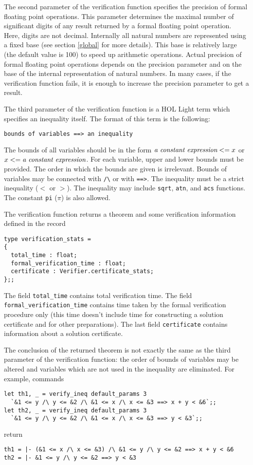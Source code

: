 \documentclass[a4paper]{article}
\begin{document}
The second parameter of the verification function specifies the precision of formal floating point operations. This parameter determines the maximal number of significant digits of any result returned by a formal floating point operation. Here, digits are not decimal. Internally all natural numbers are represented using a fixed base (see section \ref{global} for more details). This base is relatively large (the default value is 100) to speed up arithmetic operations. Actual precision of formal floating point operations depends on the precision parameter and on the base of the internal representation of natural numbers. In many cases, if the verification function fails, it is enough to increase the precision parameter to get a result.

The third parameter of the verification function is a HOL Light term which specifies an inequality itself. The format of this term is the following:
\begin{verbatim}
bounds of variables ==> an inequality
\end{verbatim}
The bounds of all variables should be in the form $\text{\it a constant expression} <= x$ or $x <= \text{\it a constant expression}$. For each variable, upper and lower bounds must be provided. The order in which the bounds are given is irrelevant. Bounds of variables may be connected with \verb|/\| or with \verb|==>|. The inequality must be a strict inequality ($<$ or $>$). The inequality may include \verb|sqrt|, \verb|atn|, and \verb|acs| functions. The constant \verb|pi| ($\pi$) is also allowed.

The verification function returns a theorem and some verification information defined in the record
\begin{verbatim}
type verification_stats =
{
  total_time : float;
  formal_verification_time : float;
  certificate : Verifier.certificate_stats;
};;
\end{verbatim}
The field \verb|total_time| contains total verification time. The field \verb|formal_verification_time| contains time taken by the formal verification procedure only (this time doesn't include time for constructing a solution certificate and for other preparations). The last field \verb|certificate| contains information about a solution certificate.

The conclusion of the returned theorem is not exactly the same as the third parameter of the verification function: the order of bounds of variables may be altered and variables which are not used in the inequality are eliminated. For example, commands
\begin{verbatim}
let th1, _ = verify_ineq default_params 3 
  `&1 <= y /\ y <= &2 /\ &1 <= x /\ x <= &3 ==> x + y < &6`;;
let th2, _ = verify_ineq default_params 3 
  `&1 <= y /\ y <= &2 /\ &1 <= x /\ x <= &3 ==> y < &3`;;
\end{verbatim}
return
\begin{verbatim}
th1 = |- (&1 <= x /\ x <= &3) /\ &1 <= y /\ y <= &2 ==> x + y < &6
th2 = |- &1 <= y /\ y <= &2 ==> y < &3
\end{verbatim}
\end{document}
